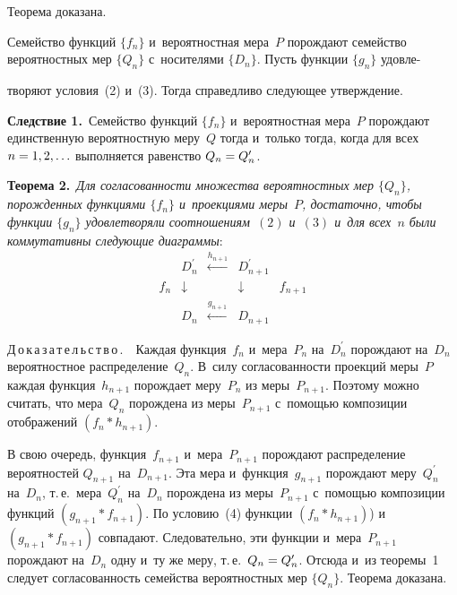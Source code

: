 \begin{multicols}{2}
    Теорема доказана.
    \smallskip

    Семейство функций $\{f_n\}$ и~вероятностная мера~$P$ порождают
семейство вероятностных мер $\{Q_n\}$ с~носителями $\{D_n\}$. Пусть
функции $\{g_n\}$ удовле-\linebreak\vspace*{-12pt}

\columnbreak

\noindent
творяют условия~(2) и~(3). Тогда справедливо
следующее утверждение.

    \smallskip

    \noindent
    \textbf{Следствие 1.}\ Семейство функций $\{f_n\}$ и~вероятностная
мера~$P$ порождают единственную вероятностную меру~$Q$ тогда и~только
тогда, когда для всех $n \hm=1, 2,\ldots$ выполняется равенство $Q_n\hm=
Q_n^\prime$.

    \smallskip

    \noindent
    \textbf{Теорема 2.}\ \textit{Для согласованности множества
вероятностных мер $\{Q_n\}$, порожденных функциями $\{f_n\}$
и~проекциями меры~$P$, достаточно, чтобы функции $\{g_n\}$
удовлетворяли соотношениям~$(2)$ и~$(3)$ и~для всех~$n$ были
коммутативны следующие диаграммы}:
    \begin{equation}
    \begin{array}{ccccc}
     & D_n^\prime & \stackrel{h_{n+1}}{\longleftarrow} & D_{n+1}^\prime & \\
    f_n & \!\!\downarrow & & \downarrow &\!\! f_{n+1}\\
    & D_n & \stackrel{g_{n+1}}{\longleftarrow} & D_{n+1} &
    \end{array}
    \label{e4-grs}
    \end{equation}

    \noindent
    Д\,о\,к\,а\,з\,а\,т\,е\,л\,ь\,с\,т\,в\,о\,.\ \ Каждая функция~$f_n$
и~мера~$P_n$ на~$D_n^\prime$ порождают на~$D_n$ вероятностное
распределение~$Q_n$. В~силу согласованности проекций меры~$P$ каждая
функция~$h_{n+1}$ порождает меру~$P_n$ из меры~$P_{n+1}$. Поэтому
можно считать, что мера~$Q_n$ порождена из меры~$P_{n+1}$ с~помощью
композиции отображений $(f_n * h_{n+1})$.

  В свою очередь, функция~$f_{n+1}$ и~мера~$P_{n+1}$ по\-рож\-да\-ют
распределение вероятностей $Q_{n+1}$ на~$D_{n+1}$. Эта мера
и~функция~$g_{n+1}$ порождают меру~$Q_n^\prime$ на~$D_n$, т.\,е.\
мера~$Q_n^\prime$ на~$D_n$ порождена из меры~$P_{n+1}$ с~помощью
композиции функций $(g_{n+1}*f_{n+1})$. По условию~(4) функции
$(f_n*h_{n+1})$) и~$(g_{n+1}*f_{n+1})$ совпадают. Следовательно, эти функции
и~мера~$P_{n+1}$ порождают на~$D_n$ одну и~ту же меру, т.\,е.\ $Q_n\hm=
Q_n^\prime$. Отсюда и~из теоремы~1 следует согласованность семейства
вероятностных мер $\{Q_n\}$. Теорема доказана.


\end{multicols}
